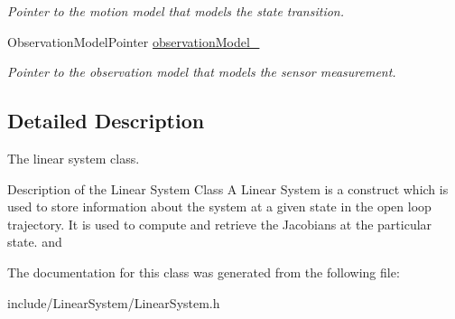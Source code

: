 \begin{DoxyCompactItemize}
\begin{DoxyCompactList}\small\item\em \-Pointer to the motion model that models the state transition. \end{DoxyCompactList}\item 
\hypertarget{class_linear_system_a6aacc355010106de6f65f66c8dfa301b}{\-Observation\-Model\-Pointer \hyperlink{class_linear_system_a6aacc355010106de6f65f66c8dfa301b}{observation\-Model\-\_\-}}\label{class_linear_system_a6aacc355010106de6f65f66c8dfa301b}

\begin{DoxyCompactList}\small\item\em \-Pointer to the observation model that models the sensor measurement. \end{DoxyCompactList}\end{DoxyCompactItemize}


\subsection{\-Detailed \-Description}
\-The linear system class. 

\begin{DoxyParagraph}{\-Description of the \-Linear \-System \-Class}
\-A \-Linear \-System is a construct which is used to store information about the system at a given state in the open loop trajectory. \-It is used to compute and retrieve the \-Jacobians at the particular state. and 
\end{DoxyParagraph}


\-The documentation for this class was generated from the following file\-:\begin{DoxyCompactItemize}
\item 
include/\-Linear\-System/\-Linear\-System.\-h\end{DoxyCompactItemize}
